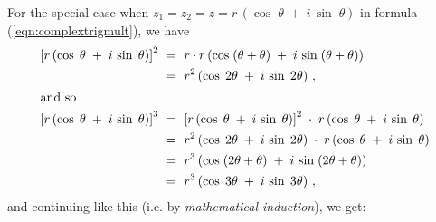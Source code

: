 For the special case when $z_1 = z_2 = z = r\,(\cos\;\theta \;+\; i\,\sin\;\theta)$ in formula
(\ref{eqn:complextrigmult}), we have
\begin{align*}
 \left[ r\,(\cos\;\theta \;+\; i\,\sin\;\theta)\right]^2 ~&=~
  r \cdot r \,(\cos\;(\theta + \theta ) \;+\; i\,\sin\;(\theta + \theta))\\
 &=~ r^2 \,(\cos\;2\theta \;+\; i\,\sin\;2\theta) ~,\\
 \intertext{and so}
 \left[ r\,(\cos\;\theta \;+\; i\,\sin\;\theta)\right]^3 ~&=~
  \left[ r\,(\cos\;\theta \;+\; i\,\sin\;\theta)\right]^2 \;\cdot\;
  r\,(\cos\;\theta \;+\; i\,\sin\;\theta )\\
 &=~ r^2 \,(\cos\;2\theta \;+\; i\,\sin\;2\theta) \;\cdot\;
  r\,(\cos\;\theta \;+\; i\,\sin\;\theta )\\
 &=~ r^3 \,(\cos\;(2\theta + \theta) \;+\; i\,\sin\;(2\theta + \theta) )\\
 &=~ r^3 \,(\cos\;3\theta \;+\; i\,\sin\;3\theta) ~,
\end{align*}
and continuing like this (i.e. by \emph{mathematical induction}), we get:


